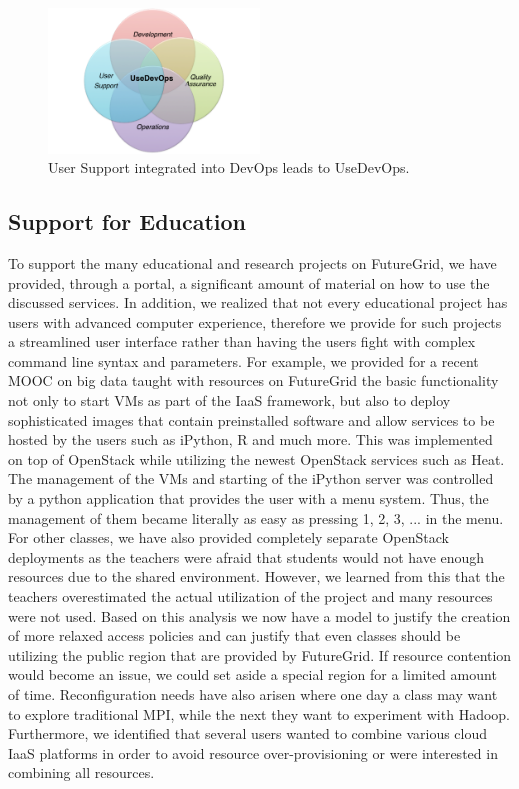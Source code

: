 \documentclass[graybox]{svmult}
\begin{document}
\begin{figure}[htb]
 \centering
   \includegraphics[width=0.5\textwidth]{images/usedevops.pdf}
 \caption{User Support integrated into DevOps leads to UseDevOps.}
 \label{F:usedevops}
\end{figure}



\subsection{Support for Education}

To support the many educational and research projects on FutureGrid, we have provided, through a portal, a significant amount of material on how to use the discussed services. In addition, we realized that not every educational project has users with advanced computer experience, therefore we provide for such projects a streamlined user interface rather than having the users fight with complex command line syntax and parameters. For example, we provided for a recent MOOC on big data taught with resources on FutureGrid the basic functionality not only to start VMs as part of the IaaS framework, but also to deploy sophisticated images that contain preinstalled software and allow services to be hosted by the users such as iPython, R and much more. This was implemented on top of OpenStack while utilizing the newest OpenStack services such as Heat. The management of the VMs and starting of the iPython server was controlled by a python application that provides the user with a menu system. Thus, the management of them became literally as easy as pressing 1, 2, 3, ... in the menu. For other classes, we have also provided completely separate OpenStack deployments as the teachers were afraid that students would not have enough resources due to the shared environment. However, we learned from this that the teachers overestimated the actual utilization of the project and many resources were not used. Based on this analysis we now have a model to justify the creation of more relaxed access policies and can justify that even classes should be utilizing the public region that are provided by FutureGrid. If resource contention would become an issue, we could set aside a special region for a limited amount of time. Reconfiguration needs have also arisen where one day a class may want to explore traditional MPI, while the next they want to experiment with Hadoop. Furthermore, we identified that several users wanted to combine various cloud IaaS platforms in order to avoid resource over-provisioning or were interested in combining all resources. 
\end{document}

